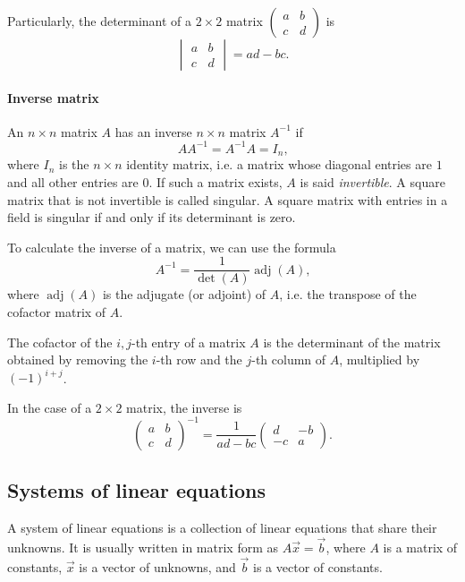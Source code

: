 Particularly, the determinant of a $2 \times 2$ matrix $\begin{pmatrix} a & b \\ c & d
\end{pmatrix}$ is $$\begin{vmatrix} a & b \\ c & d \end{vmatrix} = ad - bc\text{.}$$

\paragraph{Inverse matrix}  An $n \times n$ matrix $A$ has an inverse $n \times n$ matrix
$A^{-1}$ if
\[
  A A^{-1} = A^{-1} A = I_n\text{,}
\]
where $I_n$ is the $n \times n$ identity matrix, i.e. a matrix whose diagonal entries are
$1$ and all other entries are $0$. If such a matrix exists, $A$ is said
\emph{invertible}.  A square matrix that is not invertible is called singular. A square
matrix with entries in a field is singular if and only if its determinant is zero.

To calculate the inverse of a matrix, we can use the formula
\[
  A^{-1} = \frac{1}{\det(A)} \operatorname{adj}(A)\text{,}
\]
where $\operatorname{adj}(A)$ is the adjugate (or adjoint) of $A$, i.e. the transpose of the cofactor matrix
of $A$.

The cofactor of the $i, j$-th entry of a matrix $A$ is the determinant of the matrix
obtained by removing the $i$-th row and the $j$-th column of $A$, multiplied by $(-1)^{i
+ j}$.

In the case of a $2 \times 2$ matrix, the inverse is
\[
  \begin{pmatrix}
    a & b \\
    c & d
  \end{pmatrix}^{-1} = \frac{1}{ad - bc}
  \begin{pmatrix}
    d & -b \\
    -c & a
  \end{pmatrix}\text{.}
\]

\subsection{Systems of linear equations}

A system of linear equations is a collection of linear equations that share their
unknowns.  It is usually written in matrix form as $A \vec{x} = \vec{b}$, where $A$ is a
matrix of constants, $\vec{x}$ is a vector of unknowns, and $\vec{b}$ is a vector of
constants.


